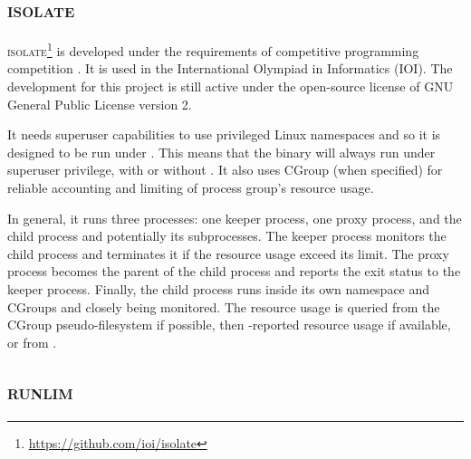 \subsection{\textsc{isolate}}

\textsc{isolate}\footnote{\href{https://github.com/ioi/isolate}{https://github.com/ioi/isolate}} is developed under the requirements of competitive programming competition \citep{marevs2012new}.
It is used in the International Olympiad in Informatics (IOI).
The development for this project is still active under the open-source license of GNU General Public License version 2.

It needs superuser capabilities to use privileged Linux namespaces and so it is designed to be run under .
This means that the binary will always run under superuser privilege, with or without .
It also uses CGroup (when specified) for reliable accounting and limiting of process group's resource usage.

In general, it runs three processes: one keeper process, one proxy process, and the child process and potentially its subprocesses.
The keeper process monitors the child process and terminates it if the resource usage exceed its limit.
The proxy process becomes the parent of the child process and reports the exit status to the keeper process.
Finally, the child process runs inside its own namespace and CGroups and closely being monitored.
The resource usage is queried from the CGroup pseudo-filesystem if possible, then -reported resource usage if available, or from .


\subsection{\textsc{runlim}}


